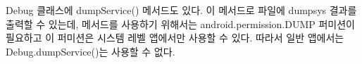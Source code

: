 Debug 클래스에 dumpService() 메서드도 있다. 이 메서드로 파일에 dumpsys 결과를 출력할 수 있는데, 메서드를 사용하기 위해서는 android.permission.DUMP 퍼미션이 필요하고 이 퍼미션은 시스템 레벨 앱에서만 사용할 수 있다. 따라서 일반 앱에서는 Debug.dumpService()는 사용할 수 없다.

